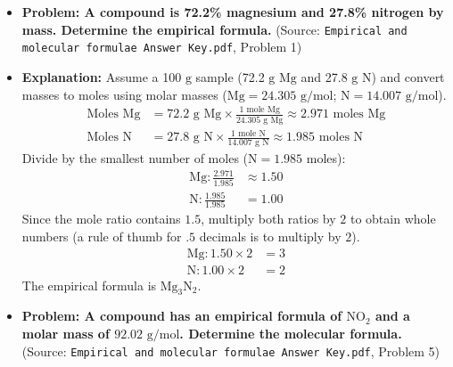 \documentclass{article}
\begin{document}
\begin{itemize}
    \item \textbf{Problem: A compound is 72.2\% magnesium and 27.8\% nitrogen by mass. Determine the empirical formula.} (Source: \texttt{Empirical and molecular formulae Answer Key.pdf}, Problem 1)

    \item \textbf{Explanation:} Assume a 100 $\text{g}$ sample (72.2 $\text{g}$ $\text{Mg}$ and 27.8 $\text{g}$ $\text{N}$) and convert masses to moles using molar masses ($\text{Mg} = 24.305 \text{ g/mol}$; $\text{N} = 14.007 \text{ g/mol}$).
    \begin{align*}
        \text{Moles Mg} &= 72.2 \text{ g Mg} \times \frac{1 \text{ mole Mg}}{24.305 \text{ g Mg}} \approx 2.971 \text{ moles Mg} \\
        \text{Moles N} &= 27.8 \text{ g N} \times \frac{1 \text{ mole N}}{14.007 \text{ g N}} \approx 1.985 \text{ moles N}
    \end{align*}
    Divide by the smallest number of moles ($\text{N} = 1.985$ moles):
    \begin{align*}
        \text{Mg}: \frac{2.971}{1.985} &\approx 1.50 \\
        \text{N}: \frac{1.985}{1.985} &= 1.00
    \end{align*}
    Since the mole ratio contains $1.5$, multiply both ratios by $2$ to obtain whole numbers (a rule of thumb for $.5$ decimals is to multiply by $2$).
    \begin{align*}
        \text{Mg}: 1.50 \times 2 &= 3 \\
        \text{N}: 1.00 \times 2 &= 2
    \end{align*}
    The empirical formula is \textbf{$\text{Mg}_3\text{N}_2$}.

    \item \textbf{Problem: A compound has an empirical formula of $\text{NO}_2$ and a molar mass of $92.02 \text{ g/mol}$. Determine the molecular formula.} (Source: \texttt{Empirical and molecular formulae Answer Key.pdf}, Problem 5)


\end{itemize}
\end{document}
